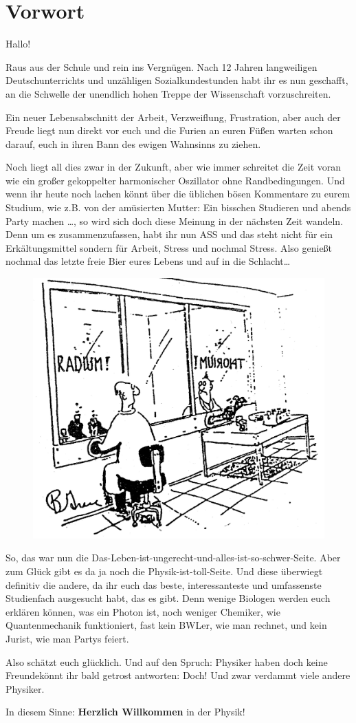 \section{Vorwort}

\hspace{0.5cm} Hallo!

Raus aus der Schule und rein ins Vergnügen. Nach 12 Jahren
langweiligen Deutschunterrichts und unzähligen Sozialkundestunden habt ihr es nun geschafft, an die Schwelle der unendlich hohen Treppe der Wissenschaft vorzuschreiten.

Ein neuer Lebensabschnitt der Arbeit, Verzweiflung, Frustration, aber auch der Freude liegt nun direkt vor euch und die Furien an euren Füßen warten schon darauf, euch in ihren Bann des ewigen Wahnsinns zu ziehen.

Noch liegt all dies zwar in der Zukunft, aber wie immer schreitet die Zeit voran wie ein großer gekoppelter harmonischer Oszillator ohne Randbedingungen.
Und wenn ihr heute noch lachen könnt über die üblichen
bösen Kommentare zu eurem Studium, wie z.B. von der amüsierten
Mutter: \glqq Ein bisschen Studieren und abends Party machen \ldots \grqq , so wird sich doch diese Meinung in der nächsten Zeit wandeln. Denn um es zusammenzufassen, habt ihr nun ASS und das steht nicht für ein Erkältungsmittel sondern für Arbeit, Stress und nochmal Stress. Also genießt nochmal das letzte freie Bier eures Lebens und auf in die Schlacht\ldots

\begin{figure}[b!]
\begin{center}
  \includegraphics[width=.45\textwidth]{bilder/radium-thorium.jpg}
\end{center}
\end{figure}

So, das war nun die \glqq Das-Leben-ist-ungerecht-und-alles-ist-so-schwer-Seite\grqq . Aber zum Glück gibt es da ja noch die \glqq Physik-ist-toll-Seite\grqq . Und diese überwiegt definitiv die andere, da ihr euch das beste, interessanteste und umfassenste Studienfach ausgesucht habt, das es gibt.
Denn wenige Biologen werden euch erklären können, was ein Photon ist, noch weniger Chemiker, wie Quantenmechanik funktioniert, fast kein BWLer, wie man rechnet, und kein Jurist, wie man Partys feiert.

Also schätzt euch glücklich.
Und auf den Spruch: \glqq Physiker haben doch keine Freunde\grqq könnt ihr bald getrost antworten: 
\glqq Doch! Und zwar verdammt viele andere Physiker.\grqq

In diesem Sinne: \textbf{Herzlich Willkommen} in der Physik!
